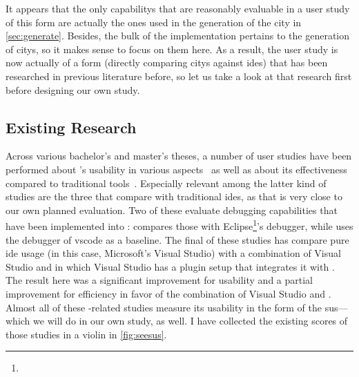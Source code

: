 \documentclass[../thesis]{subfiles}
\begin{document}
It appears that the only \glspl{capability} that are reasonably evaluable in a user study of this form are actually the ones used in the generation of the \gls{city} in \cref{sec:generate}.
Besides, the bulk of the implementation pertains to the generation of \glspl{city}, so it makes sense to focus on them here.
As a result, the user study is now actually of a form (directly comparing \glspl{city} against \glspl{ide}) that has been researched in previous literature before, so let us take a look at that research first before designing our own study.

\subsection{Existing Research}\label{subsec:research}
Across various bachelor's and master's theses, a number of user studies have been performed about \SEE{}'s usability in various aspects~\cite{davidwagner2020, felixgaebler2021, hannesmasuch2020, kevindoehl2020, maximilianwick2022, michelkrause2024, robertbohnsack2020, rubensmidt2021} as well as about its effectiveness compared to traditional tools~\cite{galperin2021, lennartkipka2020, moritz, nicoweiser2021, rohlfing2024, schramm2022, sulanabubakarov2021, yannisrohloff2021}.
Especially relevant among the latter kind of studies are the three that compare \SEE{} with traditional \glspl{ide}, as that is very close to our own planned evaluation.
Two of these evaluate debugging capabilities that have been implemented into \SEE{}:
\textcite{lennartkipka2020} compares those with Eclipse\footnote{
}'s debugger, while \textcite{rohlfing2024} uses the debugger of \gls{vscode} as a baseline.
The final of these studies has \textcite{schramm2022} compare pure \gls{ide} usage (in this case, Microsoft's Visual Studio) with a combination of Visual Studio and \SEE{} in which Visual Studio has a plugin setup that integrates it with \SEE{}.
The result here was a significant improvement for usability and a partial improvement for efficiency in favor of the combination of Visual Studio and \SEE{}.
Almost all of these \SEE{}-related studies measure its usability in the form of the \gls{sus}---which we will do in our own study, as well.
I have collected the existing scores of those studies in a \gls{violin} in \cref{fig:seesus}.

\end{document}
